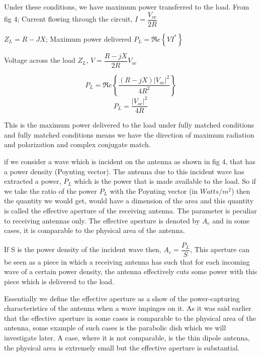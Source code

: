 Under these conditions, we have maximum power transferred to the load. From fig 4; Current flowing through the circuit, $I=\dfrac{V_{oc}}{2R}$ 

$Z_{L}=R-JX$; Maximum power delivered $P_{L}=\Re e\left\{VI^{*}\right\}$

Voltage across the load $Z_{L}$, $V={\dfrac{R-jX}{2R}}V_{oc}$ 

$$P_{L}=\Re e\left\{\dfrac{(R-jX)|V_{oc}|^{2}}{4R^{2}}\right\}$$
$$P_{L}=\dfrac{|V_{oc}|^{2}}{4R}$$

This is the maximum power delivered to the load under fully matched conditions and fully matched conditions means we have the direction of maximum radiation and polarization and complex conjugate match.

{if} we consider a wave which is incident on the antenna as shown in fig 4, that has a power density (Poynting vector). The antenna due to this incident wave has extracted a power, $P_{L}$ which is the power that is made available to the load. So if we take the ratio of the power $P_{L}$ with the Poynting vector (in $Watts/m^{2}$) then the quantity we would get, would have a dimension of the area and this quantity is called the effective aperture of the receiving antenna. The parameter is peculiar to receiving antennas only. The effective aperture is denoted by $A_{e}$ and in some cases, it is comparable to the physical area of the antenna.

If S is the power density of the incident wave then,
\newline $A_{e}=\dfrac{P_{L}}{S}$, This aperture can be seen as a piece in which a receiving antenna has such that for each incoming wave of a certain power density, the antenna effectively cuts some power with this piece which is delivered to the load.

Essentially we define the effective aperture as a show of the power-capturing characteristics of the antenna when a wave impinges on it. As it was said earlier that the effective aperture in some cases is comparable to the physical area of the antenna, some example of such cases is the parabolic dish which we will investigate later. A case, where it is not comparable, is the thin dipole antenna, the physical area is extremely small but the effective aperture is substantial.

